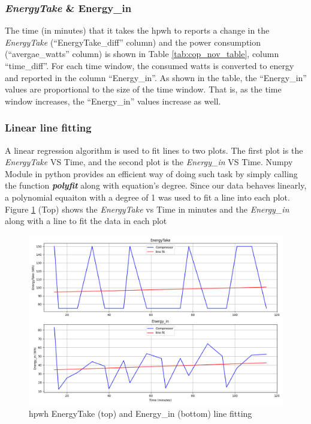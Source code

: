 \subsubsection{\textit{EnergyTake} \& Energy\_in} 

The time (in minutes) that it takes the \gls{hpwh} to reports a change in the \textit{EnergyTake} (``EnergyTake\_diff'' column) and the power consumption (``avergae\_watts'' column) is shown in Table \ref{tab:cop_nov_table}, column ``time\_diff''. For each time window, the consumed watts is converted to energy and reported in the column ``Energy\_in''. As shown in the table, the ``Energy\_in'' values are proportional to the size of the time window. That is, as the time window increases, the ``Energy\_in'' values increase as well. 

\subsubsection{Linear line fitting}

A linear regression algorithm is used to fit lines to two plots. The first plot is the \textit{EnergyTake} VS Time, and the second plot is the \textit{Energy\_in} VS Time. Numpy Module in python provides an efficient way of doing such task by simply calling the function \textit{\textbf{polyfit}} along with equation's degree. Since our data behaves linearly, a polynomial equaiton with a degree of 1 was used to fit a line into each plot. Figure \ref{fig:line_fit} (Top) shows the \textit{EnergyTake} vs Time in minutes and the \textit{Energy\_in} along with a line to fit the data in each plot

\begin{figure}[htp!]
    \centering
    \includegraphics[width=0.9\columnwidth]{Pictures/energytake_watts_line_fit_nov.png}
    \caption{\gls{hpwh} EnergyTake (top) and Energy\_in (bottom) line fitting}
    \label{fig:line_fit}
\end{figure}

